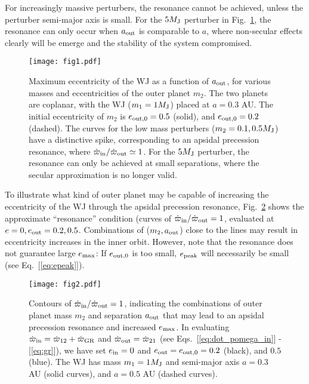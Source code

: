 \documentclass[12pt,useAMS, usenatbib]{mn2e}
\newcommand{\Max}{{\rm max}}
\newcommand{\In}{{\rm in}}
\newcommand{\Out}{{\rm out}}
\newcommand{\aout}{a_\Out}
\newcommand{\eout}{e_\Out}
\newcommand{\emax}{e_\Max}
\newcommand{\gr}{\rm GR}
\newcommand{\mjup}{M_{\rm J}}
\begin{document}
For increasingly massive perturbers, the resonance cannot be achieved, unless the perturber semi-major axis is small.  For the $5 \mjup$ perturber in Fig.~\ref{fig:emax_coplanar}, the resonance can only occur when $\aout$ is comparable to $a$, where non-secular effects clearly will be emerge and the stability of the system compromised.

\begin{figure}
\centering 
\texttt{[image: fig1.pdf]}
\caption{Maximum eccentricity of the WJ as a function of $\aout$, for various  masses and eccentricities of the outer planet $m_2$.  The two planets are coplanar, with the WJ ($m_1 = 1 \mjup$) placed at $a = 0.3$ AU.  The initial eccentricity of $m_2$ is $e_{\Out,0} = 0.5$ (solid), and $e_{\Out,0} = 0.2$ (dashed). The curves for the low mass perturbers ($m_2 = 0.1, 0.5 \mjup$) have a distinctive spike, corresponding to an apsidal precession resonance, where $\dot{\varpi}_\In / \dot{\varpi}_\Out \simeq 1$.  For the $5 \mjup$ perturber, the resonance can only be achieved at small separations, where the secular approximation is no longer valid.}
\label{fig:emax_coplanar}
\end{figure}

To illustrate what kind of outer planet may be capable of increasing the eccentricity of the WJ through the apsidal precession resonance, Fig.~\ref{fig:aps_res_params} shows the approximate ``resonance'' condition (curves of $\dot{\varpi}_\In / \dot{\varpi}_\Out = 1$, evaluated at $e = 0, \eout = 0.2, 0.5$. Combinations of ($m_2,\aout$) close to the lines may result in eccentricity increases in the inner orbit.  However, note that the resonance does not guarantee
large $\emax$: If $e_{\Out,0}$ is too small, $e_{\rm peak}$ will necessarily be small (see Eq.~[\ref{eq:epeak}]).

\begin{figure}
\centering 
\texttt{[image: fig2.pdf]}
\caption{Contours of $\dot{\varpi}_\In / \dot{\varpi}_\Out = 1$, indicating the combinations of outer planet mass $m_2$ and separation $\aout$ that may lead to an apsidal precession resonance and increased $\emax$.  In evaluating $\dot{\varpi}_\In = \dot{\varpi}_{12} + \dot{\varpi}_{\gr} $ and $\dot{\varpi}_\Out = \dot{\varpi}_{21}$ (see Eqs.~[\ref{eq:dot_pomega_in}] - [\ref{eq:gr}]), we have set $e_\In = 0$ and $e_\Out = e_{\Out,0} = 0.2$ (black), and $0.5$ (blue).  The WJ has mass $m_1 = 1 \mjup$ and semi-major axis $a = 0.3$ AU (solid curves), and $a = 0.5$ AU (dashed curves).}
\label{fig:aps_res_params}
\end{figure}
\end{document}
